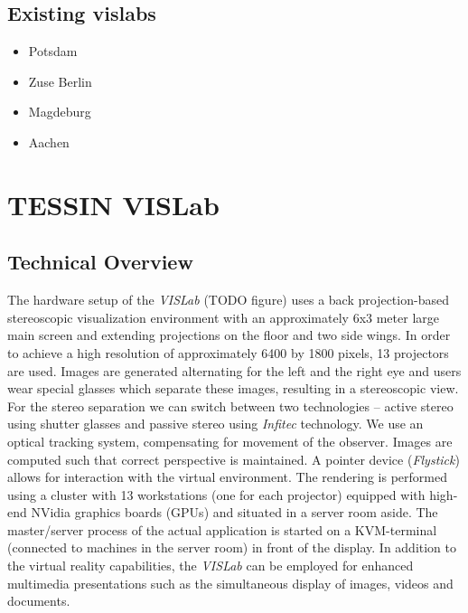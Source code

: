 \subsection{Existing vislabs}
\label{existing-vislabs}

\begin{itemize}
\itemsep1pt\parskip0pt
\item
  Potsdam
\item
  Zuse Berlin
\item
  Magdeburg
\item
  Aachen
\end{itemize}

\section{TESSIN VISLab}
\label{tessin-vislab}

\subsection{Technical Overview}
\label{technical-overview}

The hardware setup of the \emph{VISLab} (TODO figure) uses a back
projection-based stereoscopic visualization environment with an
approximately 6x3 meter large main screen and extending projections
on the floor and two side wings. In order to achieve a high resolution
of approximately 6400 by 1800 pixels, 13 projectors are used.
Images are generated alternating for the left and the right eye
and users wear special glasses which separate these images, resulting in
a stereoscopic view. For the stereo separation we can switch
between two technologies -- active stereo using shutter glasses and
passive stereo using \emph{Infitec} \cite{infitec} technology. We use an optical tracking
system, compensating for movement of the observer. Images are computed
such that correct perspective is maintained. A pointer device (\emph{Flystick}) allows for
interaction with the virtual environment. The rendering is performed
using a cluster with 13 workstations (one for each projector) equipped
with high-end NVidia graphics boards (GPUs) and situated in a server
room aside. The master/server process of the actual application is
started on a KVM-terminal (connected to machines in the server room) in
front of the display. In addition to the virtual reality capabilities,
the \emph{VISLab} can be employed for enhanced multimedia presentations such as
the simultaneous display of images, videos and documents.


